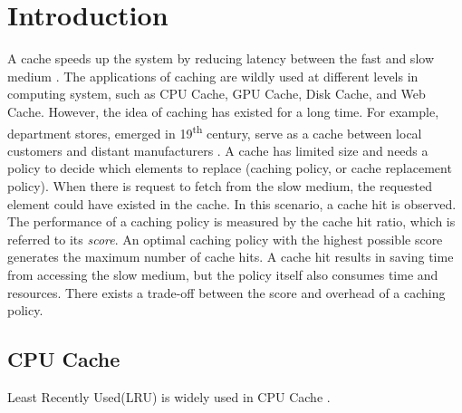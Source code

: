 \section{Introduction}
A cache speeds up the system by reducing latency between the fast and slow medium \cite{cache}.
The applications of caching are wildly used at different levels in computing system, such as
  CPU Cache, GPU Cache, Disk Cache, and Web Cache.
However, the idea of caching has existed for a long time.
For example, department stores, emerged in 19\textsuperscript{th} century,  
  serve as a cache between local customers and distant manufacturers \cite{departmentstores}.
A cache has limited size and needs a policy to decide which elements to replace 
  (caching policy, or cache replacement policy).
When there is request to fetch from the slow medium, 
  the requested element could have existed in the cache.
In this scenario, a cache hit is observed.
The performance of a caching policy is measured by the cache hit ratio, 
  which is referred to its \textit{score}.
An optimal caching policy with the highest possible score generates the maximum number of cache hits.
A cache hit results in saving time from accessing the slow medium, 
  but the policy itself also consumes time and resources. 
There exists a trade-off between the score and overhead of a caching policy.

\subsection{CPU Cache}
  Least Recently Used(LRU) is widely used in CPU Cache \cite{itanium}.
